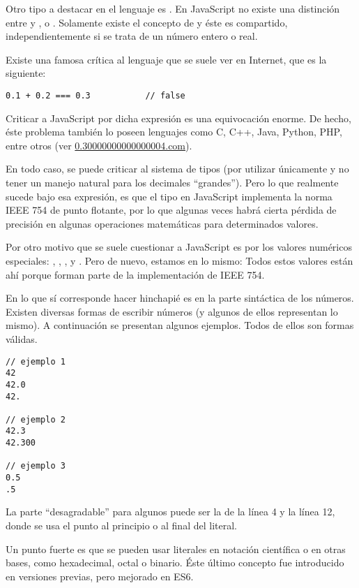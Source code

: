Otro tipo a destacar en el lenguaje es . En JavaScript no existe una distinción entre  y ,  o . Solamente existe el concepto de  y éste es compartido, independientemente si se trata de un número entero o real.

Existe una famosa crítica al lenguaje que se suele ver en Internet, que es la siguiente:

\begin{lstlisting}
0.1 + 0.2 === 0.3			// false
\end{lstlisting}

Criticar a JavaScript por dicha expresión es una equivocación enorme. De hecho, éste problema también lo poseen lenguajes como C, C++, Java, Python, PHP, entre otros (ver \href{https://0.30000000000000004.com/}{0.30000000000000004.com}). 

En todo caso, se puede criticar al sistema de tipos (por utilizar únicamente  y no tener un manejo natural para los decimales "`grandes"'). Pero lo que realmente sucede bajo esa expresión, es que el tipo  en JavaScript implementa la norma IEEE 754 de punto flotante, por lo que algunas veces habrá cierta pérdida de precisión en algunas operaciones matemáticas para determinados valores. 

Por otro motivo que se suele cuestionar a JavaScript es por los valores numéricos especiales: , , ,  y . Pero de nuevo, estamos en lo mismo: Todos estos valores están ahí porque forman parte de la implementación de IEEE 754.

En lo que sí corresponde hacer hinchapié es en la parte sintáctica de los números. Existen diversas formas de escribir números (y algunos de ellos representan lo mismo). A continuación se presentan algunos ejemplos. Todos de ellos son formas válidas.

\begin{lstlisting}
// ejemplo 1
42
42.0
42.

// ejemplo 2
42.3
42.300

// ejemplo 3
0.5
.5
\end{lstlisting}

La parte "`desagradable"' para algunos puede ser la de la línea 4 y la línea 12, donde se usa el punto al principio o al final del literal. 

Un punto fuerte es que se pueden usar literales en notación científica o en otras bases, como hexadecimal, octal o binario. Éste último concepto fue introducido en versiones previas, pero mejorado en ES6.

